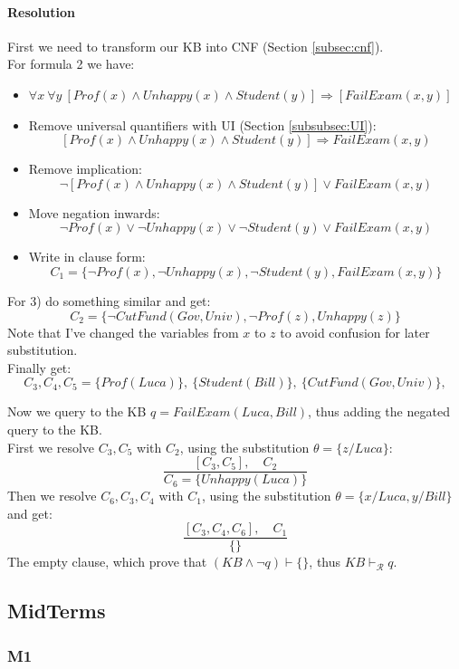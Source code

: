 \documentclass[10pt,a4paper]{article}
\begin{document}
\begin{itemize}
\paragraph{Resolution}
First we need to transform our KB into CNF (Section \ref{subsec:cnf}).\\
For formula 2 we have:
\begin{itemize}
\item $\forall x\ \forall y\ [Prof(x) \wedge Unhappy(x)\wedge Student(y)]\Rightarrow [FailExam(x,y)]$
\item Remove universal quantifiers with UI (Section \ref{subsubsec:UI}):
\[[Prof(x) \wedge Unhappy(x)\wedge Student(y)]\Rightarrow FailExam(x,y)\]
\item Remove implication:
\[\neg [Prof(x) \wedge Unhappy(x)\wedge Student(y)]\vee FailExam(x,y)\]
\item Move negation inwards:
\[\neg Prof(x) \vee \neg Unhappy(x)\vee \neg Student(y)\vee FailExam(x,y)\]
\item Write in clause form:
\[C_1=\lbrace \neg Prof(x), \neg Unhappy(x), \neg Student(y), FailExam(x,y)\rbrace\]
\end{itemize}
For 3) do something similar and get:
\[C_2= \lbrace \neg CutFund(Gov,Univ),\neg Prof(z), Unhappy(z) \rbrace\]
Note that I've changed the variables from $x$ to $z$ to avoid confusion for later substitution.\\
Finally get:
\[C_3,C_4,C_5=\lbrace Prof(Luca) \rbrace,\ \lbrace Student(Bill) \rbrace,\ \lbrace CutFund(Gov,Univ) \rbrace,\]

Now we query to the KB $q= FailExam(Luca,Bill)$, thus adding the negated query to the KB.\\
First we resolve $C_3,C_5$ with $C_2$, using the substitution $\theta=\lbrace z/Luca \rbrace$:
\[\frac{[C_3,C_5],\quad C_2}{C_6=\lbrace Unhappy(Luca) \rbrace}\]
Then we resolve $C_6,C_3,C_4$ with $C_1$, using the substitution $\theta= \lbrace x/Luca, y/Bill \rbrace$ and get:
\[\frac{[C_3,C_4,C_6],\quad C_1}{\lbrace \rbrace}\]
The empty clause, which prove that $(KB \wedge \neg q)\vdash \{\}$, thus $KB \vdash_{\mathcal{R}} q$.



\subsection{MidTerms}
\subsubsection{M1}



\end{itemize}
\end{document}
